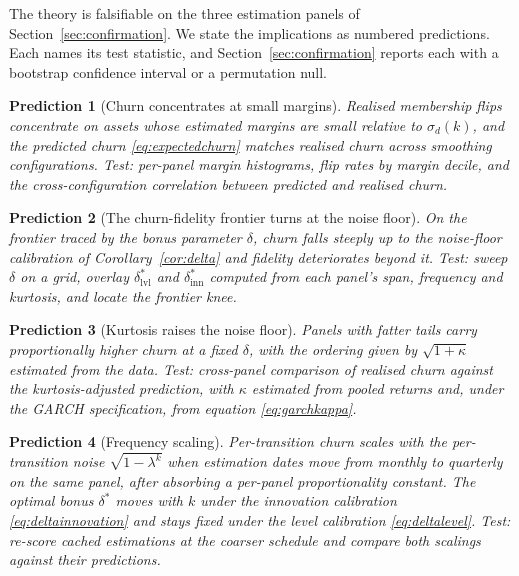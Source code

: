 \documentclass{rQUF2e}
\theoremstyle{plain}
\newtheorem{prediction}{Prediction}
\theoremstyle{remark}
\begin{document}
The theory is falsifiable on the three estimation panels of
Section~\ref{sec:confirmation}. We state the implications as numbered
predictions. Each names its test statistic, and Section~\ref{sec:confirmation}
reports each with a bootstrap confidence interval or a permutation null.

\begin{prediction}[Churn concentrates at small margins]
\label{pred:margins}
Realised membership flips concentrate on assets whose estimated margins are
small relative to $\sigma_d(k)$, and the predicted churn
\eqref{eq:expectedchurn} matches realised churn across smoothing
configurations. Test: per-panel margin histograms, flip rates by margin
decile, and the cross-configuration correlation between predicted and realised
churn.
\end{prediction}

\begin{prediction}[The churn-fidelity frontier turns at the noise floor]
\label{pred:knee}
On the frontier traced by the bonus parameter $\delta$, churn falls steeply up
to the noise-floor calibration of Corollary~\ref{cor:delta} and fidelity
deteriorates beyond it. Test: sweep $\delta$ on a grid, overlay
$\delta^{*}_{\mathrm{lvl}}$ and $\delta^{*}_{\mathrm{inn}}$ computed from each
panel's span, frequency and kurtosis, and locate the frontier knee.
\end{prediction}

\begin{prediction}[Kurtosis raises the noise floor]
\label{pred:kurtosis}
Panels with fatter tails carry proportionally higher churn at a fixed
$\delta$, with the ordering given by $\sqrt{1+\kappa}$ estimated from the
data. Test: cross-panel comparison of realised churn against the
kurtosis-adjusted prediction, with $\kappa$ estimated from pooled returns and,
under the GARCH specification, from equation \eqref{eq:garchkappa}.
\end{prediction}

\begin{prediction}[Frequency scaling]
\label{pred:frequency}
Per-transition churn scales with the per-transition noise
$\sqrt{1-\lambda^{k}}$ when estimation dates move from monthly to quarterly on
the same panel, after absorbing a per-panel proportionality constant. The
optimal bonus $\delta^{*}$ moves with $k$ under the innovation calibration
\eqref{eq:deltainnovation} and stays fixed under the level calibration
\eqref{eq:deltalevel}. Test: re-score cached estimations at the coarser
schedule and compare both scalings against their predictions.
\end{prediction}
\end{document}

